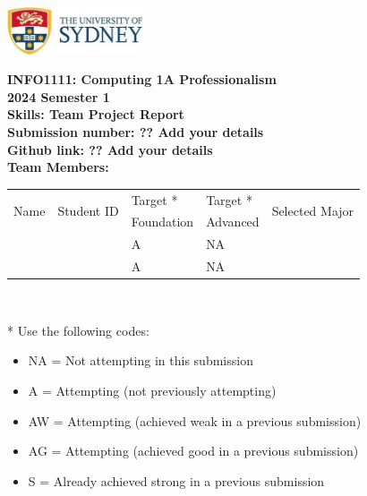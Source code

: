 \documentclass[a4paper, 11pt]{report}
\begin{document}
\begin{titlepage}
\begin{flushright}
\includegraphics[width=4cm]{USyd}\\[1cm]
\end{flushright}

\begin{centering}
\textbf{\huge INFO1111: Computing 1A Professionalism}\\[0.75cm]
\textbf{\huge 2024 Semester 1}\\[2cm]
\textbf{\huge Skills: Team Project Report}\\[2cm]

\textbf{\large Submission number: ?? Add your details}\\[0.5cm]
\textbf{\large Github link: ?? Add your details}\\[0.75cm]
\textbf{\huge Team Members:}\\[0.75cm]

\begin{tabular}{|p{}|p{}|p{}|p{}|p{}|}
	\hline
	\multirow{2}{*}{Name} & \multirow{2}{*}{Student ID} & Target * & Target * & \multirow{2}{*}{Selected Major} \\
	 & & Foundation & Advanced & \\
	\hline
	\hline
	\raggedright{\studB} & \sidB & A & NA & \majB \\
	\hline
	\raggedright{\studC} & \sidC & A & NA & \majC \\
	\hline
\end{tabular}
\\[0.5cm]
\end{centering}

* Use the following codes:
\begin{itemize}
\setlength\itemsep{0em}
\item NA = Not attempting in this submission
\item A = Attempting (not previously attempting)
\item AW = Attempting (achieved weak in a previous submission) 
\item AG = Attempting (achieved good in a previous submission)
\item S = Already achieved strong in a previous submission
\end{itemize}

\thispagestyle{empty}
\end{titlepage}
\end{document}
